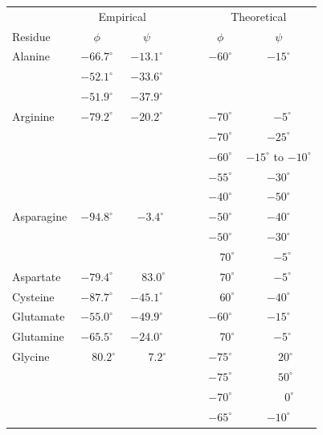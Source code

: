 \documentclass[12pt]{article}
\begin{document}
\begin{center}
\footnotesize
\begin{tabular}{lccccc}
&  \multicolumn{2}{c}{Empirical} & ~~~& \multicolumn{2}{c}{Theoretical}\\\cline{2-3}\cline{5-6}
Residue & $\phi$ & $\psi$ & & $\phi$ & $\psi$ \\
\hline Alanine   & $-66.7^{\circ}$ & $-13.1^{\circ}$ & & $-60^{\circ}$ & $-15^{\circ}$\\
                 & $-52.1^{\circ}$ & $-33.6^{\circ}$ & &\\
                 & $-51.9^{\circ}$ & $-37.9^{\circ}$ & &\\
Arginine         & $-79.2^{\circ}$ & $-20.2^{\circ}$ & & $-70^{\circ}$ & ~\,$-5^{\circ}$ \\
		 &	&	& & $-70^{\circ}$ & $-25^{\circ}$\\
		 &	&	& & $-60^{\circ}$ & $-15^{\circ}$ to $-10^{\circ}$\\
		 &	&	& & $-55^{\circ}$ & $-30^{\circ}$\\
                 &      &       & & $-40^{\circ}$ & $-50^{\circ}$\\      
Asparagine       & $-94.8^{\circ}$ & ~\,$-3.4^{\circ}$ & & $-50^{\circ}$ & $-40^{\circ}$ \\
                 &      &       & & $-50^{\circ}$ & $-30^{\circ}$\\
		 &      &       & & $\phantom{-}70^{\circ}$ & ~\,$-5^{\circ}$\\
Aspartate        & $-79.4^{\circ}$ & $\phantom{-}83.0^{\circ}$ & & $\phantom{-}70^{\circ}$ & ~\,$-5^{\circ}$ \\
Cysteine         & $-87.7^{\circ}$ & $-45.1^{\circ}$ & & $\phantom{-}60^{\circ}$ & $-40^{\circ}$ \\
Glutamate        & $-55.0^{\circ}$ & $-49.9^{\circ}$ & & $-60^{\circ}$ & $-15^{\circ}$\\
Glutamine        & $-65.5^{\circ}$ & $-24.0^{\circ}$ & & $\phantom{-}70^{\circ}$ & ~\,$-5^{\circ}$\\
Glycine          & $\phantom{-}80.2^{\circ}$ & ~\,$\phantom{-}7.2^{\circ}$ & & $-75^{\circ}$ & $\phantom{-}20^{\circ}$  \\
                 &      &       & & $-75^{\circ}$ & $\phantom{-}50^{\circ}$\\
                 &      &       & & $-70^{\circ}$ & ~\,$\phantom{-}0^{\circ}$\\
                 &      &       & & $-65^{\circ}$ & $-10^{\circ}$\\

\end{tabular}
\end{center}
\end{document}
